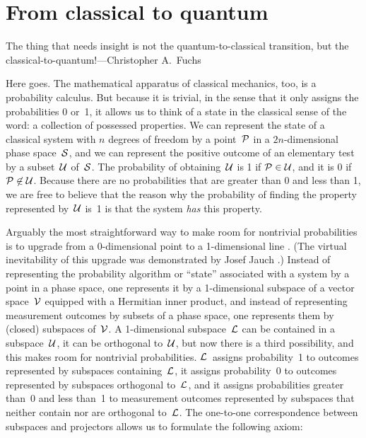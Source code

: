 \documentclass[12pt]{article}
\newcommand{\cP}{{\cal P}}
\newcommand{\cS}{{\cal S}}
\newcommand{\cU}{{\cal U}}
\newcommand{\cL}{{\cal L}}
\newcommand{\cV}{{\cal V}}
\begin{document}
\section{From classical to quantum}\label{sec.cq}
{\leftskip\parindent\small The thing that needs insight is not the quantum-to-classical transition, but the classical-to-quantum!---Christopher A.\ Fuchs \cite{FuchsPeri}\par}\medskip

\noindent Here goes. The mathematical apparatus of classical mechanics, too, is a probability calculus. But because it is trivial, in the sense that it only assigns the probabilities 0 or~1,  it allows us to think of a state in the classical sense of the word: a collection of possessed properties. We can represent the state of a classical system with $n$ degrees of freedom by a point~$\cP$ in a $2n$-dimensional phase space~$\cS$, and we can represent the positive outcome of an elementary test by a subset~$\cU$ of~$\cS$. The probability of obtaining~$\cU$ is 1 if $\cP\in\cU$, and it is 0 if $\cP\not\in\cU$. Because there are no probabilities that are greater than 0 and less than 1, we are free to believe that the reason why the probability of finding the property represented by~$\cU$ is~1 is that the system \emph{has} this property.

Arguably the most straightforward way to make room for nontrivial probabilities is to upgrade from a 0-dimensional point to a 1-dimensional line \cite{Mohrhoff-QMexplained}. (The virtual inevitability of this upgrade was demonstrated by Josef Jauch \cite{Jauch}.) Instead of representing the probability algorithm or ``state'' associated with a system by a point in a phase space, one represents it by a 1-dimensional subspace of a vector space~$\cV$ equipped with a Hermitian inner product, and instead of representing measurement outcomes by subsets of a phase space, one represents them by (closed) subspaces of~$\cV$. A {1-dimensional} subspace~$\cL$ can be contained in a subspace~$\cU$, it can be orthogonal to~$\cU$, but now there is a third possibility, and this makes room for nontrivial probabilities. $\cL$~assigns probability~1 to outcomes represented by subspaces containing~$\cL$, it assigns probability~0 to outcomes represented by subspaces orthogonal to~$\cL$, and it assigns probabilities greater than~0 and less than~1 to measurement outcomes represented by subspaces that neither contain nor are orthogonal to~$\cL$. The one-to-one correspondence between subspaces and projectors allows us to formulate the following axiom:
\end{document}
